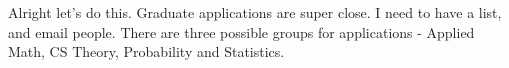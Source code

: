 \noindent {}

Alright let's do this. Graduate applications are super close. I need to have a list, and email people. There are three possible groups for applications - Applied Math, CS Theory, Probability and Statistics. 

